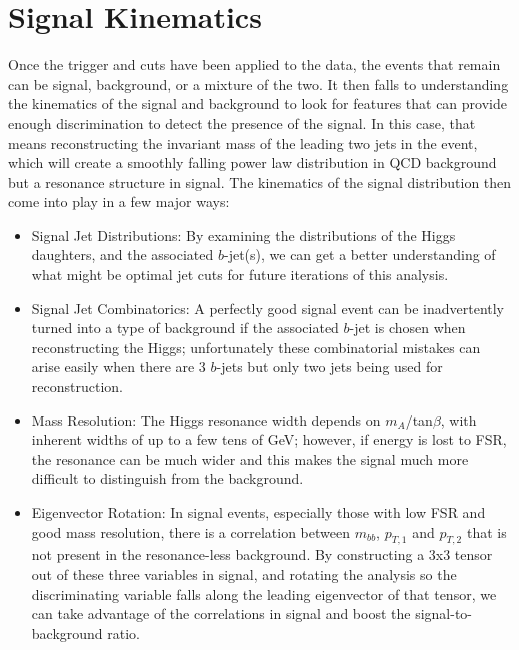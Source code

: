  

\chapter[Signal Kinematics]{Signal Kinematics}

 
Once the trigger and cuts have been applied to the data, the events that remain can be signal, background, or a mixture of the two.  
It then falls to understanding the kinematics of the signal and background to look for features that can
provide enough discrimination to detect the presence of the signal.  In this case, that means reconstructing
the invariant mass of the leading two jets in the event, which will create a smoothly falling power
law distribution in QCD background but a resonance structure in signal.  The kinematics of the signal
distribution then come into play in a few major ways:
\begin{itemize}
    \item Signal Jet \pt Distributions:  By examining the \pt distributions 
    of the Higgs daughters, and the associated $b$-jet(s), 
    we can get a better understanding of what might be optimal jet \pt cuts for future iterations of this analysis. 
    \item Signal Jet Combinatorics: A perfectly good signal event can be inadvertently 
    turned into a type of background if the associated $b$-jet is 
    chosen when reconstructing the Higgs; unfortunately these combinatorial mistakes can arise easily when 
    there are 3 $b$-jets but only two jets being used for reconstruction.
    \item Mass Resolution: The Higgs resonance width depends on $m_A$/tan$\beta$, with inherent widths
of up to a few tens of GeV; however, if energy is lost to FSR, the resonance can be much wider and this makes
the signal much more difficult to distinguish from the background.
    \item Eigenvector Rotation: In signal events, especially those with low FSR and good mass resolution,
    there is a correlation between $m_{bb}$, $p_{T,1}$ and $p_{T,2}$ that is not present in the resonance-less
    background.  By constructing a 3x3 tensor out of these three variables in signal, and rotating the analysis so the
    discriminating variable falls along the leading eigenvector of that tensor, we can take advantage of the correlations
    in signal and boost the signal-to-background ratio.
\end{itemize}


